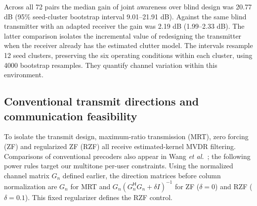 Across all 72 pairs the median gain of joint awareness over blind design was 20.77 dB (95\% seed-cluster bootstrap interval 9.01--21.91 dB). Against the same blind transmitter with an adapted receiver the gain was 2.19 dB (1.99--2.33 dB). The latter comparison isolates the incremental value of redesigning the transmitter when the receiver already has the estimated clutter model. The intervals resample 12 seed clusters, preserving the six operating conditions within each cluster, using 4000 bootstrap resamples. They quantify channel variation within this environment.

\subsection{Conventional transmit directions and communication feasibility}
To isolate the transmit design, maximum-ratio transmission (MRT), zero forcing (ZF) and regularized ZF (RZF) all receive estimated-kernel MVDR filtering. Comparisons of conventional precoders also appear in Wang \emph{et al.}~\cite{wangclutter}; the following power rules target our multitone per-user constraints. Using the normalized channel matrix $G_n$ defined earlier, the direction matrices before column normalization are $G_n$ for MRT and $G_n(G_n^{\mathsf H}G_n+\delta I)^{-1}$ for ZF ($\delta=0$) and RZF ($\delta=0.1$). This fixed regularizer defines the RZF control.

